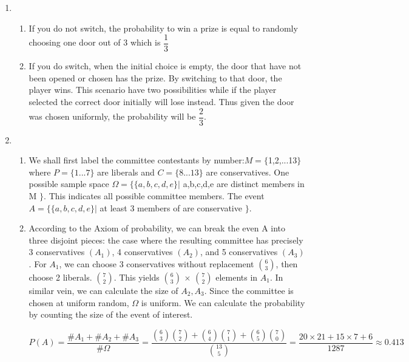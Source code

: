 \documentclass[11pt, oneside]{article}
\begin{document}
\begin{enumerate}
\begin{enumerate}
    \end{enumerate}
    \item \begin{enumerate}
        \item If you do not switch, the probability to win a prize is equal to randomly choosing one door out of 3 which is $\dfrac{1}{3}$
        \item If you do switch, when the initial choice is empty, the door that have not been opened or chosen has the prize. By switching to that door, the player wins. This scenario have two possibilities while if the player selected the correct door initially will lose instead. Thus given the door was chosen uniformly, the probability will be $\dfrac{2}{3}$.
    \end{enumerate}
    \item \begin{enumerate}
        \item We shall first label the committee contestants by number:$M=\{$1,2,...13$\}$ where $P=\{1...7\}$ are liberals and $C=\{8...13\}$ are conservatives. One possible sample space $\Omega =\{\{a,b,c,d,e\} |$ a,b,c,d,e are distinct members in M  $\}$. This indicates all possible committee members.
        \newline The event $A=\{\{a,b,c,d,e\} |$ at least 3 members of are conservative  $\}$.
        \item According to the Axiom of probability, we can break the even A into three disjoint pieces: the case where the resulting committee has precisely 3 conservatives $(A_1)$, 4 conservatives $(A_2)$, and 5 conservatives $(A_3)$. 
        \newline For $A_1$, we can choose 3 conservatives without replacement ${6}\choose{3}$, then choose 2 liberals. ${7}\choose{2}$. This yields ${6}\choose{3}$ $\times$ $ {7}\choose{2}$ elements in $A_1$. In similar vein, we can calculate the size of $A_2, A_3$.
        \newline Since the committee is chosen at uniform random, $\Omega$ is uniform. We can calculate the probability by counting the size of the event of interest.
        
        \[ P(A) = \dfrac{\# A_1+\#A_2 +\#A_3}{\#\Omega}=
        \dfrac{{6\choose3}{7\choose2}+ {6\choose4}{7\choose1}+{6\choose5}{7\choose0}}
        {{13\choose5}}=
        \dfrac{20\times 21+ 15\times 7 + 6}{1287}\approx
        0.413
        \]
    \end{enumerate}
\end{enumerate}
\end{document}
